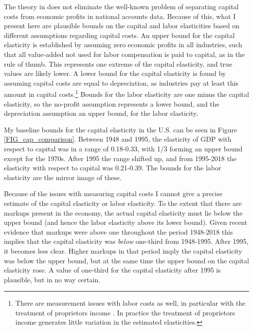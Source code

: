 \documentclass[11pt]{article}
\begin{document}
The theory in \cite{bfshortnote,bfprodge} does not eliminate the well-known problem of separating capital costs from economic profits in national accounts data. Because of this, what I present here are plausible bounds on the capital and labor elasticities based on different assumptions regarding capital costs. An upper bound for the capital elasticity is established by assuming zero economic profits in all industries, such that all value-added not used for labor compensation is paid to capital, as in the rule of thumb. This represents one extreme of the capital elasticity, and true values are likely lower. A lower bound for the capital elasticity is found by assuming capital costs are equal to depreciation, as industries pay at least this amount in capital costs.\footnote{There are measurement issues with labor costs as well, in particular with the treatment of proprietors income \citep{Gollin:2002zr,gommerupert2004,elsbyhs2013}. In practice the treatment of proprietors income generates little variation in the estimated elasticities.} Bounds for the labor elasticity are one minus the capital elasticity, so the no-profit assumption represents a lower bound, and the depreciation assumption an upper bound, for the labor elasticity. 

My baseline bounds for the capital elasticity in the U.S. can be seen in Figure \ref{FIG_cap_comparison}. Between 1948 and 1995, the elasticity of GDP with respect to capital was in a range of 0.18-0.33, with 1/3 forming an upper bound except for the 1970s. After 1995 the range shifted up, and from 1995-2018 the elasticity with respect to capital was 0.21-0.39. The bounds for the labor elasticity are the mirror image of these.

Because of the issues with measuring capital costs I cannot give a precise estimate of the capital elasticity or labor elasticity. To the extent that there are markups present in the economy, the actual capital elasticity must lie below the upper bound (and hence the labor elasticity above its lower bound). Given recent evidence that markups were above one throughout the period 1948-2018 \citep{Barkai000,edmondetal2018,NBERw23687,RePEc:nbr:nberwo:22897,basu2019} this implies that the capital elasticity was \textit{below} one-third from 1948-1995. After 1995, it becomes less clear. Higher markups in that period imply the capital elasticity was below the upper bound, but at the same time the upper bound on the capital elasticity rose. A value of one-third for the capital elasticity after 1995 is plausible, but in no way certain.
\end{document}
